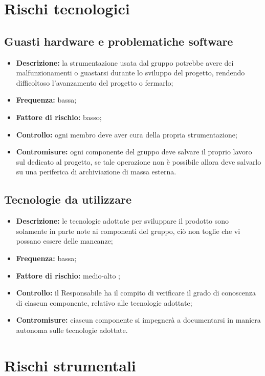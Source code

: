 \documentclass[./PianodiProgetto.tex]{subfiles}
\begin{document}
	\section{Rischi tecnologici}
	\subsection{Guasti hardware e problematiche software}
	\begin{itemize}
		\item \textbf{Descrizione:} la strumentazione usata dal gruppo potrebbe avere dei malfunzionamenti o guastarsi durante lo sviluppo del progetto, rendendo difficoltoso l'avanzamento del progetto o fermarlo;
		\item \textbf{Frequenza:} bassa;
		\item \textbf{Fattore di rischio:} basso;
		\item \textbf{Controllo:} ogni membro deve aver cura della propria strumentazione;
		\item \textbf{Contromisure:} ogni componente del gruppo deve salvare il proprio lavoro sul   dedicato al progetto, se tale operazione non è possibile allora deve salvarlo su una periferica di archiviazione di massa esterna.
	\end{itemize}
	
	\subsection{Tecnologie da utilizzare}
	\begin{itemize}
		\item \textbf{Descrizione:} le tecnologie adottate per sviluppare il prodotto sono solamente in parte note ai componenti del gruppo, ciò non toglie che vi possano essere delle mancanze;
		\item \textbf{Frequenza:} bassa;
		\item \textbf{Fattore di rischio:} medio-alto ;
		\item \textbf{Controllo:} il Responsabile ha il compito di verificare il grado di conoscenza di ciascun componente, relativo alle tecnologie adottate;
		\item \textbf{Contromisure:} ciascun componente si impegnerà a documentarsi in maniera autonoma sulle tecnologie adottate. 
	\end{itemize}
	
	\section{Rischi strumentali}
\end{document}
